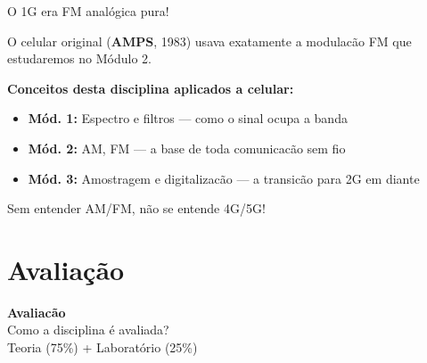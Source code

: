 \documentclass[aspectratio=169]{beamer}
\begin{document}
\begin{frame}{O 1G era FM anal\'{o}gica pura!}

O celular original (\textbf{AMPS}, 1983) usava exatamente a modulac\~{a}o FM que estudaremos no M\'{o}dulo 2.

\vspace{0.3cm}

\textbf{Conceitos desta disciplina aplicados a celular:}
\begin{itemize}
  \item \textbf{M\'{o}d. 1:} Espectro e filtros --- como o sinal ocupa a banda
  \item \textbf{M\'{o}d. 2:} AM, FM --- a base de toda comunicac\~{a}o sem fio
  \item \textbf{M\'{o}d. 3:} Amostragem e digitalizac\~{a}o --- a transic\~{a}o para 2G em diante
\end{itemize}

\vspace{0.3cm}

\alert{Sem entender AM/FM, n\~{a}o se entende 4G/5G!}

\end{frame}

\section{Avalia\c{c}\~{a}o}

{
\begin{frame}[plain,c]
\begin{center}
{\Huge\textbf{Avaliac\~{a}o}}\\[0.8cm]
{\LARGE Como a disciplina \'{e} avaliada?}\\[0.5cm]
{\large Teoria (75\%) + Laborat\'{o}rio (25\%)}
\end{center}
\end{frame}
}
\end{document}
